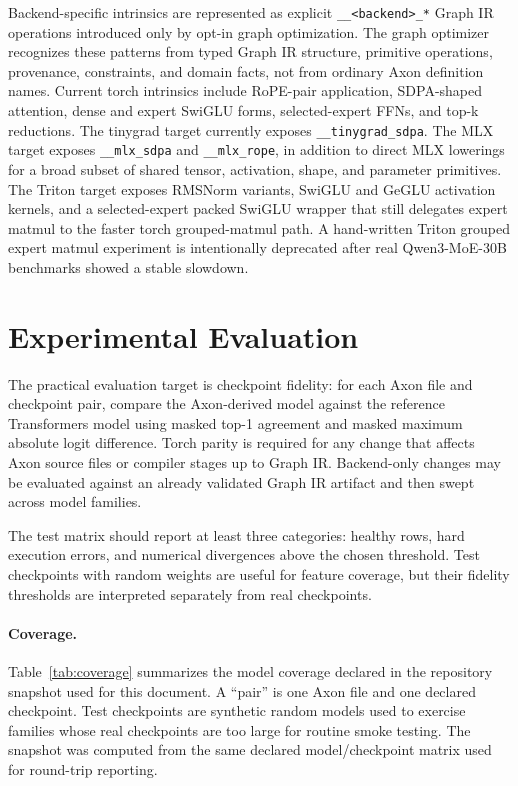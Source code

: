 \documentclass{article}
\newcommand{\code}[1]{\texttt{#1}}
\begin{document}
Backend-specific intrinsics are represented as explicit \code{\_\_<backend>\_*}
Graph IR operations introduced only by opt-in graph optimization.  The graph
optimizer recognizes these patterns from typed Graph IR structure, primitive
operations, provenance, constraints, and domain facts, not from ordinary Axon
definition names.  Current torch intrinsics include RoPE-pair application,
SDPA-shaped attention, dense and expert SwiGLU forms, selected-expert FFNs, and
top-k reductions.  The tinygrad target currently exposes
\code{\_\_tinygrad\_sdpa}.  The MLX target exposes \code{\_\_mlx\_sdpa} and
\code{\_\_mlx\_rope}, in addition to direct MLX lowerings for a broad subset of
shared tensor, activation, shape, and parameter primitives.
The Triton target exposes RMSNorm variants, SwiGLU and GeGLU activation kernels,
and a selected-expert packed SwiGLU wrapper that still delegates expert matmul
to the faster torch grouped-matmul path.  A hand-written Triton grouped expert
matmul experiment is intentionally deprecated after real Qwen3-MoE-30B
benchmarks showed a stable slowdown.

\section{Experimental Evaluation}

The practical evaluation target is checkpoint fidelity: for each Axon file and
checkpoint pair, compare the Axon-derived model against the reference
Transformers model using masked top-1 agreement and masked maximum absolute
logit difference.  Torch parity is required for any change that affects Axon
source files or compiler stages up to Graph IR.  Backend-only changes may be
evaluated against an already validated Graph IR artifact and then swept across
model families.

The test matrix should report at least three categories: healthy rows, hard
execution errors, and numerical divergences above the chosen threshold.  Test
checkpoints with random weights are useful for feature coverage, but their
fidelity thresholds are interpreted separately from real checkpoints.

\paragraph{Coverage.}
Table~\ref{tab:coverage} summarizes the model coverage declared in the
repository snapshot used for this document.  A ``pair'' is one Axon file and
one declared checkpoint.  Test checkpoints are synthetic random models used to
exercise families whose real checkpoints are too large for routine smoke
testing.  The snapshot was computed from the same declared model/checkpoint
matrix used for round-trip reporting.
\end{document}
